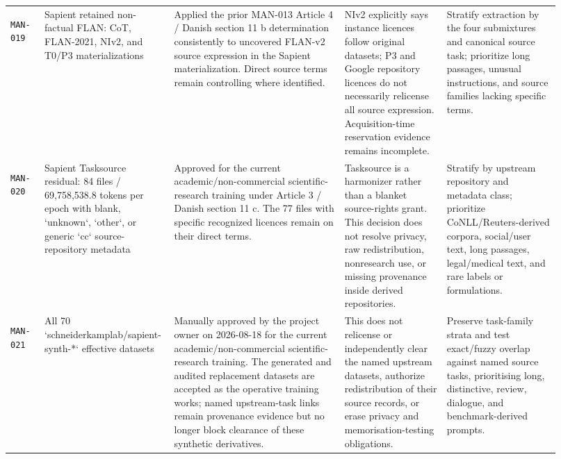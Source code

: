 \documentclass[9pt,a4paper]{article}
\newcommand{\manid}[1]{\hypertarget{manual:#1}{\texttt{#1}}}
\begin{document}
\begin{landscape}
\begin{longtable}{@{}L{0.06\linewidth}L{0.18\linewidth}L{0.30\linewidth}L{0.18\linewidth}L{0.20\linewidth}@{}}
\manid{MAN-019} & Sapient retained non-factual FLAN: CoT, FLAN-2021, NIv2, and T0/P3 materializations & Applied the prior MAN-013 Article 4 / Danish section 11 b determination consistently to uncovered FLAN-v2 source expression in the Sapient materialization. Direct source terms remain controlling where identified. & NIv2 explicitly says instance licences follow original datasets; P3 and Google repository licences do not necessarily relicense all source expression. Acquisition-time reservation evidence remains incomplete. & Stratify extraction by the four submixtures and canonical source task; prioritize long passages, unusual instructions, and source families lacking specific terms. \\
\manid{MAN-020} & Sapient Tasksource residual: 84 files / 69,758,538.8 tokens per epoch with blank, `unknown`, `other`, or generic `cc` source-repository metadata & Approved for the current academic/non-commercial scientific-research training under Article 3 / Danish section 11 c. The 77 files with specific recognized licences remain on their direct terms. & Tasksource is a harmonizer rather than a blanket source-rights grant. This decision does not resolve privacy, raw redistribution, nonresearch use, or missing provenance inside derived repositories. & Stratify by upstream repository and metadata class; prioritize CoNLL/Reuters-derived corpora, social/user text, long passages, legal/medical text, and rare labels or formulations. \\
\manid{MAN-021} & All 70 `schneiderkamplab/sapient-synth-*` effective datasets & Manually approved by the project owner on 2026-08-18 for the current academic/non-commercial scientific-research training. The generated and audited replacement datasets are accepted as the operative training works; named upstream-task links remain provenance evidence but no longer block clearance of these synthetic derivatives. & This does not relicense or independently clear the named upstream datasets, authorize redistribution of their source records, or erase privacy and memorisation-testing obligations. & Preserve task-family strata and test exact/fuzzy overlap against named source tasks, prioritising long, distinctive, review, dialogue, and benchmark-derived prompts. \\

\end{longtable}
\end{landscape}
\end{document}
